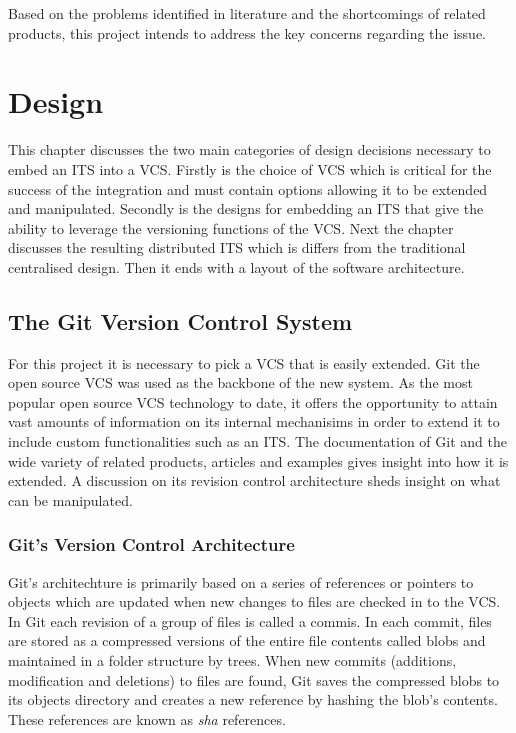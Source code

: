 \documentclass{mproj}
\begin{document}
Based on the problems identified in literature and the shortcomings of related products, this project intends to address the key concerns regarding the issue.


\chapter{Design}\label{design}

This chapter discusses the two main categories of design decisions necessary to embed an ITS into a VCS. Firstly is the choice of VCS which is critical for the success of the integration and must contain options allowing it to be extended and manipulated. Secondly is the designs for embedding an ITS that give the ability to leverage the versioning functions of the VCS. Next the chapter discusses the resulting distributed ITS which is differs from the traditional centralised design. Then it ends with a layout of the software architecture.




\section{The Git Version Control System}

For this project it is necessary to pick a VCS that is easily extended. Git the open source VCS was used as the backbone of the new system. As the most popular open source VCS  technology to date, it offers the opportunity to attain vast amounts of information on its internal mechanisims in order to extend it to include custom functionalities such as an ITS. The documentation of Git and the wide variety of related products, articles and examples gives insight into how it is extended. A discussion on its revision control architecture sheds insight on what can be manipulated.



\subsection{Git's Version Control Architecture}

Git's architechture is primarily based on a series of references or pointers to objects which are updated when new changes to files are checked in to the VCS. In Git each revision of a group of files is called a commis. In each commit, files are stored as a compressed versions of the entire file contents called blobs and maintained in a folder structure by trees. When new commits (additions, modification and deletions) to files are found, Git saves the compressed blobs to its objects directory and creates a new reference by hashing the blob's contents. These references are known as \textit{sha} references. 
\end{document}
